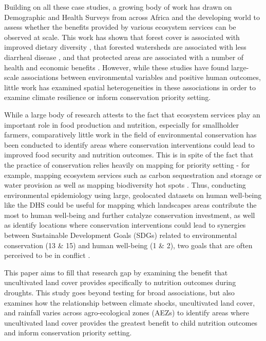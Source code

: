 \documentclass{article}
\begin{document}
Building on all these case studies, a growing body of work has drawn on Demographic and Health Surveys from across Africa and the developing world to assess whether the benefits provided by various ecosystem services can be observed at scale.  This work has shown that forest cover is associated with improved dietary diversity \cite{Ickowitz2014, Rasolofoson2018}, that forested watersheds are associated with less diarrheal disease \cite{Herrera2017}, and that protected areas are associated with a number of health and economic benefits \cite{naidoo2019evaluating}.  However, while these studies have found large-scale associations between environmental variables and positive human outcomes, little work has examined spatial heterogeneities in these associations in order to examine climate resilience or inform conservation priority setting.

While a large body of research attests to the fact that ecosystem services play an important role in food production and nutrition, especially for smallholder farmers, comparatively little work in the field of environmental conservation has been conducted to identify areas where conservation interventions could lead to improved food security and nutrition outcomes.  This is in spite of the fact that the practice of conservation relies heavily on mapping for priority setting - for example, mapping ecosystem services such as carbon sequestration and storage \cite{Kim2016} or water provision \cite{immerzeel2020importance} as well as mapping biodiversity hot spots \cite{holland2012conservation}.  Thus, conducting environmental epidemiology using large, geolocated datasets on human well-being like the DHS could be useful for mapping which landscapes areas contribute the most to human well-being and further catalyze conservation investment, as well as identify locations where conservation interventions could lead to synergies between Sustainable Development Goals (SDGs) related to environmental conservation (13 \& 15) and human well-being (1 \& 2), two goals that are often perceived to be in conflict \cite{moore2016improving, mcshane2011hard}.

This paper aims to fill that research gap by examining the benefit that uncultivated land cover provides specifically to nutrition outcomes during droughts.  This study goes beyond testing for broad associations, but also examines how the relationship between climate shocks, uncultivated land cover, and rainfall varies across agro-ecological zones (AEZs) to identify areas where uncultivated land cover provides the greatest benefit to child nutrition outcomes and inform conservation priority setting.
\end{document}
